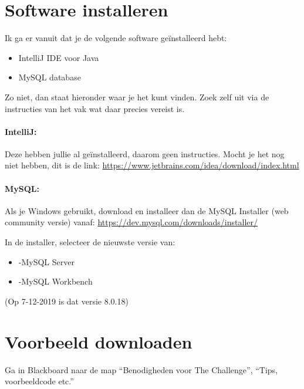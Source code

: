 \section{Software installeren}

Ik ga er vanuit dat je de volgende software geïnstalleerd hebt:

\begin{itemize}
\item IntelliJ IDE voor Java
\item MySQL database
\end{itemize}

Zo niet, dan staat hieronder waar je het kunt vinden. Zoek zelf uit via de instructies van het vak wat daar precies vereist is.

\paragraph{IntelliJ: }

Deze hebben jullie al geïnstalleerd, daarom geen instructies. Mocht je het nog niet hebben, dit is de link:
\href{https://www.jetbrains.com/idea/download/index.html}{https://www.jetbrains.com/idea/download/index.html}


\paragraph{MySQL:}

Als je Windows gebruikt, download en installeer dan de MySQL Installer (web community versie) vanaf:
\href{https://dev.mysql.com/downloads/installer/}{https://dev.mysql.com/downloads/installer/}


In de installer, selecteer de nieuwste versie van:

\begin{itemize}

\item -MySQL Server
\item -MySQL Workbench

\end{itemize}

(Op 7-12-2019 is dat versie 8.0.18)

\section{Voorbeeld downloaden}


Ga in Blackboard naar de map “Benodigheden voor The Challenge”, “Tips, voorbeeldcode etc.” 

